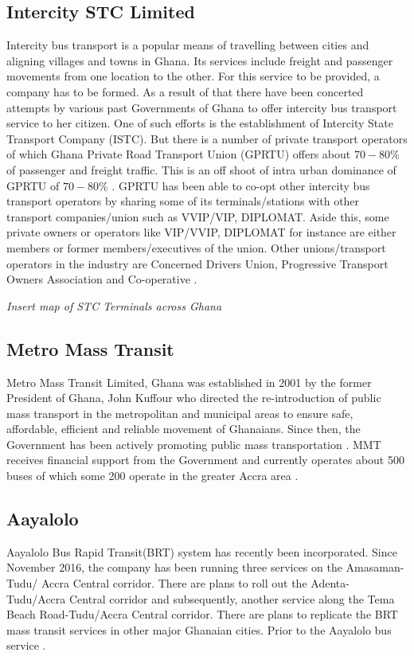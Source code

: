 \documentclass[oneside,12pt]{book}
\begin{document}
\subsection{Intercity STC Limited}
Intercity bus transport is a popular means of travelling between cities and aligning villages and towns in Ghana. Its services include freight and passenger movements from one location to the other. For this service to be provided, a company has to be formed. As a result of that there have been concerted attempts by various past Governments of Ghana to offer intercity bus transport service to her citizen. One of such efforts is the establishment of Intercity State Transport Company (ISTC). But there is a number of private transport operators 
of which Ghana Private Road Transport Union (GPRTU) offers about $70-80\%$ of passenger and freight traffic. This is an off shoot of intra urban dominance of GPRTU of $70-80\%$ \citep{abane2011travel}. GPRTU has been able to co-opt other intercity bus transport operators by sharing some of its terminals/stations with other transport 
companies/union such as VVIP/VIP, DIPLOMAT. Aside this, some private owners or operators like VIP/VVIP, DIPLOMAT for instance are either members or former members/executives of the union. Other unions/transport operators in the industry are Concerned Drivers Union, Progressive Transport Owners Association and Co-operative \citep{ojobus}.

\textit{Insert map of STC Terminals across Ghana}

\subsection{Metro Mass Transit}
Metro  Mass  Transit  Limited, Ghana was established in 2001 by the former President of Ghana, John Kuffour who directed the re-introduction of public mass transport in the metropolitan and municipal areas to ensure safe, affordable, efficient and reliable movement of Ghanaians. Since then, the Government has been actively promoting public mass transportation \citep{olateju2009appraisal}. MMT receives financial support from the Government and currently operates about 500 buses of which some 200 operate in the greater Accra area \citep{finn2009new}.

\subsection{Aayalolo}
Aayalolo Bus Rapid Transit(BRT) system has recently been incorporated. Since November 2016, the company has been running three services on the Amasaman-Tudu/
Accra Central corridor. There are plans to roll out the Adenta-Tudu/Accra Central corridor and subsequently, another service along the Tema Beach Road-Tudu/Accra Central corridor. There are plans to replicate the BRT mass transit services in other major Ghanaian cities. Prior to the Aayalolo bus service \citep{agyemang2017mode}.
\end{document}
